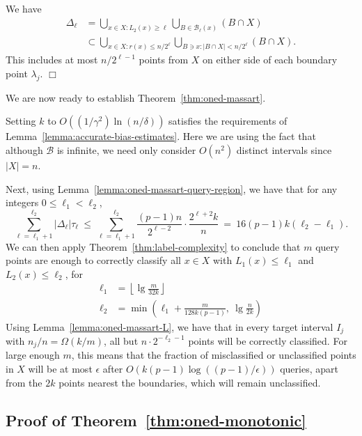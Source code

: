 \documentclass{article}
\def\B{{\mathcal B}}
\newenvironment{proof}{\noindent {\sc Proof:}}{$\Box$ \medskip}
\begin{document}
\begin{proof}
We have
\begin{align*}
\Delta_\ell 
&= \bigcup_{x \in X: L_2(x) \geq \ell} \bigcup_{B \in \B_{\ell}(x)} (B \cap X) \\
&\subset \bigcup_{x \in X: r(x) \leq n/2^\ell} \bigcup_{B \ni x: |B \cap X| < n/2^\ell} (B \cap X) 
.
\end{align*}
This includes at most $n/2^{\ell-1}$ points from $X$ on either side of each boundary point $\lambda_j$.
\end{proof}

We are now ready to establish Theorem~\ref{thm:oned-massart}.

Setting $k$ to $O((1/\gamma^2) \ln (n/\delta))$ satisfies the requirements of Lemma~\ref{lemma:accurate-bias-estimates}. Here we are using the fact that although $\B$ is infinite, we need only consider $O(n^2)$ distinct intervals since $|X| = n$.

Next, using Lemma~\ref{lemma:oned-massart-query-region}, we have that for any integers $0 \leq \ell_1 < \ell_2$,
$$ \sum_{\ell = \ell_1+1}^{\ell_2} |\Delta_\ell| \tau_\ell
\ \leq \ 
\sum_{\ell = \ell_1+1}^{\ell_2} \frac{(p-1) n}{2^{\ell-2}} \cdot \frac{2^{\ell+2}k}{n}
\ = \ 
16(p-1)k (\ell_2 - \ell_1).
$$
We can then apply Theorem~\ref{thm:label-complexity} to conclude that $m$ query points are enough to correctly classify all $x \in X$ with $L_1(x) \leq \ell_1$ and $L_2(x) \leq \ell_2$, for
\begin{align*}
\ell_1
&= 
\left\lfloor \lg \frac{m}{32k} \right\rfloor \\
\ell_2
&=
\min \left( \ell_1 + \frac{m}{128 k(p-1)}, \ \lg \frac{n}{2k} \right)
\end{align*}
Using Lemma~\ref{lemma:oned-massart-L}, we have that in every target interval $I_j$ with $n_j/n = \Omega(k/m)$, all but $n \cdot 2^{-\ell_2-1}$ points will be correctly classified. For large enough $m$, this means that the fraction of misclassified or unclassified points in $X$ will be at most $\epsilon$ after $O(k(p-1) \log ((p-1)/\epsilon))$ queries, apart from the $2k$ points nearest the boundaries, which will remain unclassified.

\subsection{Proof of Theorem~\ref{thm:oned-monotonic}}
\end{document}
